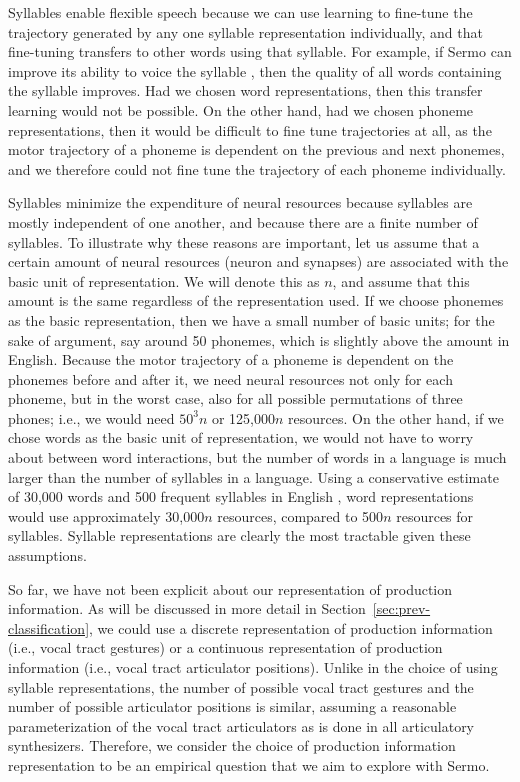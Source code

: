 Syllables enable flexible speech
because we can use learning to
fine-tune the trajectory generated by any
one syllable representation individually,
and that fine-tuning transfers
to other words using that syllable.
For example,
if Sermo can improve its ability
to voice the syllable \ipa{[bA]},
then the quality of all words
containing the syllable \ipa{[bA]}
improves.
Had we chosen word representations,
then this transfer learning
would not be possible.
On the other hand,
had we chosen phoneme representations,
then it would be difficult
to fine tune trajectories at all,
as the motor trajectory of a phoneme
is dependent on the
previous and next phonemes,
and we therefore could not fine tune
the trajectory of each phoneme individually.

Syllables minimize the expenditure of neural resources
because syllables are mostly independent of one another,
and because there are a finite number of syllables.
To illustrate why these reasons are important,
let us assume that a certain amount of
neural resources (neuron and synapses)
are associated with the basic unit of representation.
We will denote this as $n$,
and assume that this amount is the same
regardless of the representation used.
If we choose phonemes as the basic representation,
then we have a small number of basic units;
for the sake of argument,
say around 50 phonemes,
which is slightly above the amount
in English.
Because the motor trajectory
of a phoneme is dependent on the
phonemes before and after it,
we need neural resources not only for
each phoneme, but in the worst case,
also for all possible
permutations of three phones;
i.e., we would need $50^3n$ or 125,000$n$ resources.
On the other hand, if we chose
words as the basic unit of representation,
we would not have to worry about
between word interactions,
but the number of words in a language
is much larger than the number of syllables
in a language.
Using a conservative estimate
of 30,000 words and 500 frequent syllables in English
\citep{schiller1996},
word representations would use approximately
30,000$n$ resources,
compared to 500$n$ resources for syllables.
Syllable representations are clearly the most tractable
given these assumptions.

So far, we have not been explicit
about our representation of production information.
As will be discussed in more detail
in Section~\ref{sec:prev-classification},
we could use a discrete representation
of production information
(i.e., vocal tract gestures)
or a continuous representation
of production information
(i.e., vocal tract articulator positions).
Unlike in the choice of
using syllable representations,
the number of possible vocal tract gestures
and the number of possible articulator positions
is similar,
assuming a reasonable parameterization
of the vocal tract articulators
as is done in all articulatory synthesizers.
Therefore, we consider the choice
of production information representation
to be an empirical question
that we aim to explore with Sermo.

